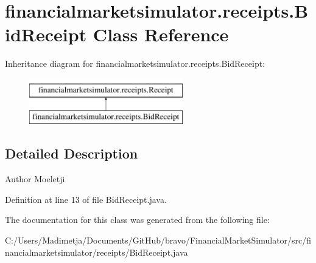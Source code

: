 \hypertarget{classfinancialmarketsimulator_1_1receipts_1_1_bid_receipt}{\section{financialmarketsimulator.\+receipts.\+Bid\+Receipt Class Reference}
\label{classfinancialmarketsimulator_1_1receipts_1_1_bid_receipt}
}
Inheritance diagram for financialmarketsimulator.\+receipts.\+Bid\+Receipt\+:\begin{figure}[H]
\begin{center}
\leavevmode
\includegraphics[height=2.000000cm]{classfinancialmarketsimulator_1_1receipts_1_1_bid_receipt}
\end{center}
\end{figure}


\subsection{Detailed Description}
\begin{DoxyAuthor}{Author}
Moeletji 
\end{DoxyAuthor}


Definition at line 13 of file Bid\+Receipt.\+java.



The documentation for this class was generated from the following file\+:\begin{DoxyCompactItemize}
\item 
C\+:/\+Users/\+Madimetja/\+Documents/\+Git\+Hub/bravo/\+Financial\+Market\+Simulator/src/financialmarketsimulator/receipts/Bid\+Receipt.\+java\end{DoxyCompactItemize}
